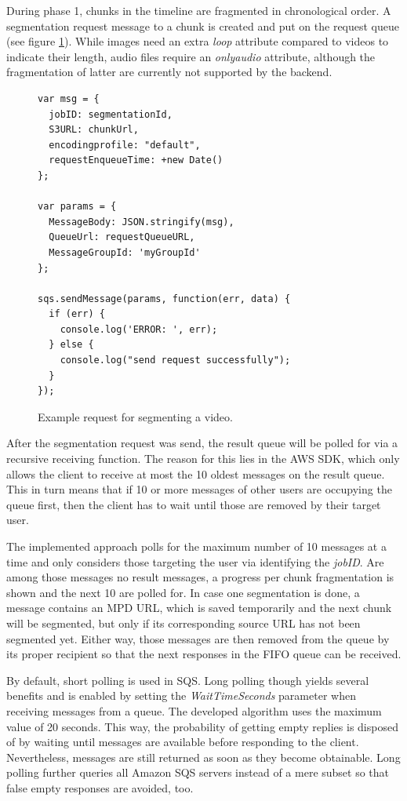 \documentclass[conference]{IEEEtran}
\begin{document}
During phase 1, chunks in the timeline are fragmented in chronological order.
A segmentation request message to a chunk is created and put on the request queue (see figure \ref{fig:segmentation}).
While images need an extra \textit{loop} attribute compared to videos to indicate their length, audio files require an \textit{onlyaudio} attribute, although the fragmentation of latter are currently not supported by the backend.
\begin{figure}[H]
\begin{lstlisting}
var msg = {
  jobID: segmentationId,
  S3URL: chunkUrl,
  encodingprofile: "default",
  requestEnqueueTime: +new Date()
};

var params = {
  MessageBody: JSON.stringify(msg),
  QueueUrl: requestQueueURL,
  MessageGroupId: 'myGroupId'
};

sqs.sendMessage(params, function(err, data) {
  if (err) {
    console.log('ERROR: ', err);
  } else {
    console.log("send request successfully");
  }
});
\end{lstlisting}
\caption{Example request for segmenting a video.}
\label{fig:segmentation}
\end{figure}
After the segmentation request was send, the result queue will be polled for via a recursive receiving function.
The reason for this lies in the AWS SDK, which only allows the client to receive at most the 10 oldest messages on the result queue.
This in turn means that if 10 or more messages of other users are occupying the queue first, then the client has to wait until those are removed by their target user. 

The implemented approach polls for the maximum number of 10 messages at a time and only considers those targeting the user via identifying the \textit{jobID}.
Are among those messages no result messages, a progress per chunk fragmentation is shown and the next 10 are polled for.
In case one segmentation is done, a message contains an MPD URL, which is saved temporarily and the next chunk will be segmented, but only if its corresponding source URL has not been segmented yet.
Either way, those messages are then removed from the queue by its proper recipient so that the next responses in the FIFO queue can be received.

By default, short polling is used in SQS.
Long polling though yields several benefits and is enabled by setting the \textit{WaitTimeSeconds} parameter when receiving messages from a queue.
The developed algorithm uses the maximum value of 20 seconds.
This way, the probability of getting empty replies is disposed of by waiting until messages are available before responding to the client.
Nevertheless, messages are still returned as soon as they become obtainable.
Long polling further queries all Amazon SQS servers instead of a mere subset so that false empty responses are avoided, too.
\\
\end{document}
